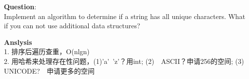     
\begin{description}
    \item{\textbf{Question}}:\\%
		Implement an algorithm to determine if a string has all unique characters. What if you can not use additional data structures?

    \item{\textbf{Anslysis}}\\
		1. 排序后遍历查重，O(nlgn) \\
		2. 用哈希来处理存在性问题，(1)'a'~'z'？用int; (2)　ASCII？申请256的空间; (3) UNICODE?　申请更多的空间

\end{description}

